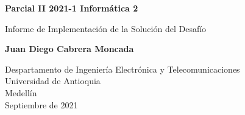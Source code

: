 \documentclass{article}
\begin{document}
\begin{titlepage}
    \begin{center}
        \vspace*{1cm}
            
        \Huge
        \textbf{Parcial II 2021-1 Informática 2}
            
        \vspace{0.5cm}
        \LARGE
        Informe de Implementación de la Solución del Desafío
            
        \vspace{1.5cm}
            
        \textbf{Juan Diego Cabrera Moncada}\\
            
        \vfill
            
        \vspace{0.8cm}
            
        \Large
        Despartamento de Ingeniería Electrónica y Telecomunicaciones\\
        Universidad de Antioquia\\
        Medellín\\
        Septiembre de 2021
            
    \end{center}
\end{titlepage}

\tableofcontents
\newpage
\end{document}
